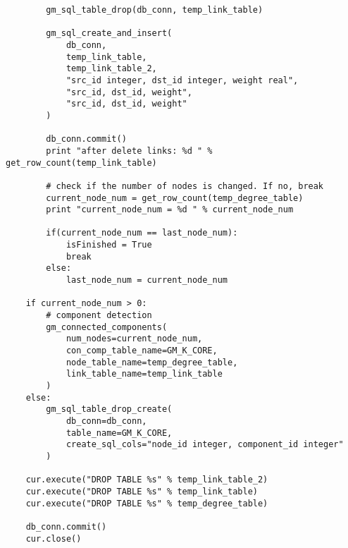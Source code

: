 \begin{lstlisting}
        gm_sql_table_drop(db_conn, temp_link_table)

        gm_sql_create_and_insert(
            db_conn,
            temp_link_table,
            temp_link_table_2,
            "src_id integer, dst_id integer, weight real",
            "src_id, dst_id, weight",
            "src_id, dst_id, weight"
        )

        db_conn.commit()
        print "after delete links: %d " % get_row_count(temp_link_table)

        # check if the number of nodes is changed. If no, break
        current_node_num = get_row_count(temp_degree_table)
        print "current_node_num = %d " % current_node_num

        if(current_node_num == last_node_num):
            isFinished = True
            break
        else:
            last_node_num = current_node_num

    if current_node_num > 0:
        # component detection
        gm_connected_components(
            num_nodes=current_node_num,
            con_comp_table_name=GM_K_CORE,
            node_table_name=temp_degree_table,
            link_table_name=temp_link_table
        )
    else:
        gm_sql_table_drop_create(
            db_conn=db_conn,
            table_name=GM_K_CORE,
            create_sql_cols="node_id integer, component_id integer"
        )

    cur.execute("DROP TABLE %s" % temp_link_table_2)
    cur.execute("DROP TABLE %s" % temp_link_table)
    cur.execute("DROP TABLE %s" % temp_degree_table)

    db_conn.commit()
    cur.close()
\end{lstlisting}